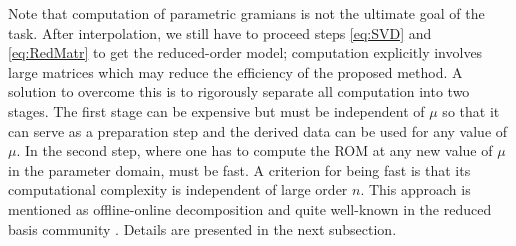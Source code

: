 Note that computation of parametric gramians is not the ultimate goal of the task. After interpolation, we still have to proceed steps \eqref{eq:SVD} and \eqref{eq:RedMatr} to get the reduced-order model; computation explicitly involves large matrices which may reduce the efficiency of the proposed method. %
A solution to overcome this is to rigorously separate all computation into two stages. The first stage can be expensive but must be independent of $\mu$ so that it can serve as a preparation step and the derived data can be used for any value of $\mu$.  In the second step, where one has to compute the ROM at any new value of $\mu$ in the parameter domain, must be fast. A criterion for being fast is that its computational complexity is independent of large order $n$. This approach is mentioned as offline-online decomposition and quite well-known in the reduced basis community \cite{PateR07,HeRS16}. Details are presented in the next subsection. %

